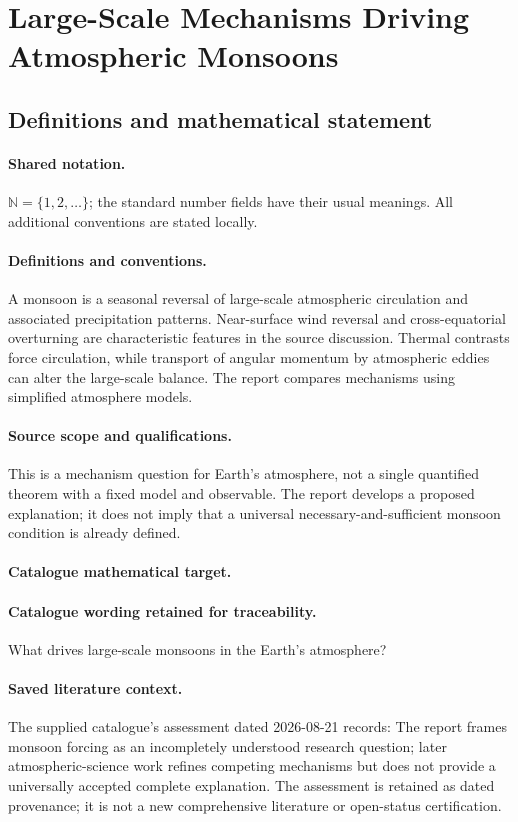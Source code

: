 \documentclass[11pt]{article}
\begin{document}
\section{Large-Scale Mechanisms Driving Atmospheric Monsoons}\label{statement}

\subsection{Definitions and mathematical statement}

\paragraph{Shared notation.}$\mathbb N=\{1,2,\ldots\}$; the standard number fields have their usual meanings. All additional conventions are stated locally.


\paragraph{Definitions and conventions.} A monsoon is a seasonal reversal of large-scale atmospheric circulation and associated precipitation patterns. Near-surface wind reversal and cross-equatorial overturning are characteristic features in the source discussion. Thermal contrasts force circulation, while transport of angular momentum by atmospheric eddies can alter the large-scale balance. The report compares mechanisms using simplified atmosphere models.

\paragraph{Source scope and qualifications.} This is a mechanism question for Earth's atmosphere, not a single quantified theorem with a fixed model and observable. The report develops a proposed explanation; it does not imply that a universal necessary-and-sufficient monsoon condition is already defined.

\paragraph{Catalogue mathematical target.}
\paragraph{Catalogue wording retained for traceability.}
What drives large-scale monsoons in the Earth's atmosphere?

\paragraph{Saved literature context.} The supplied catalogue's assessment dated 2026-08-21 records: The report frames monsoon forcing as an incompletely understood research question; later atmospheric-science work refines competing mechanisms but does not provide a universally accepted complete explanation. The assessment is retained as dated provenance; it is not a new comprehensive literature or open-status certification.
\end{document}
